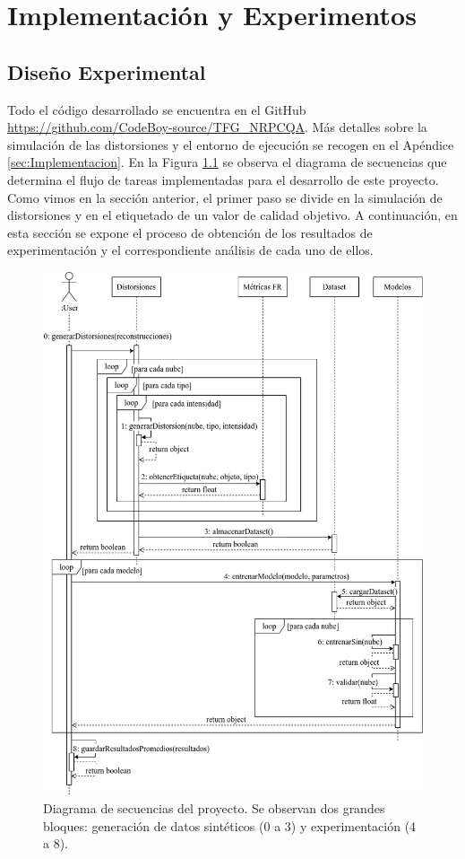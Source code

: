 \chapter{Implementación y Experimentos} 
\section{Diseño Experimental} 

Todo el código desarrollado se encuentra 
en el GitHub \url{https://github.com/CodeBoy-source/TFG_NRPCQA}.
Más detalles sobre la simulación de las distorsiones y el entorno de 
ejecución se recogen en el Apéndice \ref{sec:Implementacion}.
En la Figura \ref{fig:TFGSequence} se observa el diagrama de secuencias 
que determina el flujo de tareas implementadas para el desarrollo de este proyecto. 
Como vimos en la sección anterior, el primer paso se divide en la simulación 
de distorsiones y en el etiquetado de un valor de calidad objetivo.
A continuación, en esta sección se expone el proceso de obtención de los resultados de 
experimentación y el correspondiente análisis de cada uno de ellos. 

\begin{figure}[htp]
  \begin{center}
    \includegraphics[width=\textwidth]{imagenes/chapter5/TFGSequence}
  \end{center}
  \caption[Diagrama de secuencias del proyecto.]{Diagrama de secuencias del proyecto. Se observan dos grandes bloques:
    generación de datos sintéticos (0 a 3) y experimentación (4 a 8).  }
  \label{fig:TFGSequence}
\end{figure}
  

